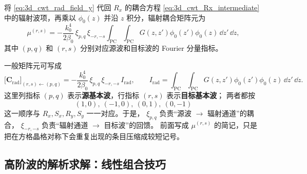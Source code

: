 将 \cref{eq:3d_cwt_rad_field_y} 代回 $R_x$ 的耦合方程 \cref{eq:3d_cwt_Rx_intermediate} 中的辐射波项，再乘以 $\phi_0(z)$ 并沿 $z$ 积分，辐射耦合矩阵元为
\begin{equation}
\mu^{(r,s)} = -\frac{k_0^4}{2\beta_0}\,\xi_{p,q}\,\xi_{-r,-s}\int_{\mathrm{PC}}\!\!\int_{\mathrm{PC}} G(z,z')\phi_0(z')\phi_0(z)\,\dd z'\,\dd z,
\label{eq:3d_cwt_Crad_element_derivation}
\end{equation}
其中 $(p,q)$ 和 $(r,s)$ 分别对应源波和目标波的 Fourier 分量指标。

一般矩阵元可写成
\begin{equation}
\bigl[\bm C_{\mathrm{rad}}\bigr]_{(r,s)\leftarrow(p,q)}
=
-\frac{k_0^4}{2\beta_0}\,
\xi_{p,q}\,\xi_{-r,-s}\,I_{\mathrm{rad}},
\qquad
I_{\mathrm{rad}}
=
\int_{\mathrm{PC}}\!\!\int_{\mathrm{PC}}
G(z,z')\phi_0(z')\phi_0(z)\,\dd z'\,\dd z.
\label{eq:3d_cwt_Crad_general_entry}
\end{equation}
这里列指标 $(p,q)$ 表示\textbf{源基本波}，行指标 $(r,s)$ 表示\textbf{目标基本波}；
两者都按
\[
(1,0),\ (-1,0),\ (0,1),\ (0,-1)
\]
这一顺序与
$R_x,S_x,R_y,S_y$ 一一对应。于是，
$\xi_{p,q}$ 负责“源波 $\to$ 辐射通道”的耦合，
$\xi_{-r,-s}$ 负责“辐射通道 $\to$ 目标波”的回馈。
前面写成 $\mu^{(r,s)}$ 的简记，只是把在方格晶格对称下会重复出现的条目压缩成较短记号。

\subsection{高阶波的解析求解：线性组合技巧}


